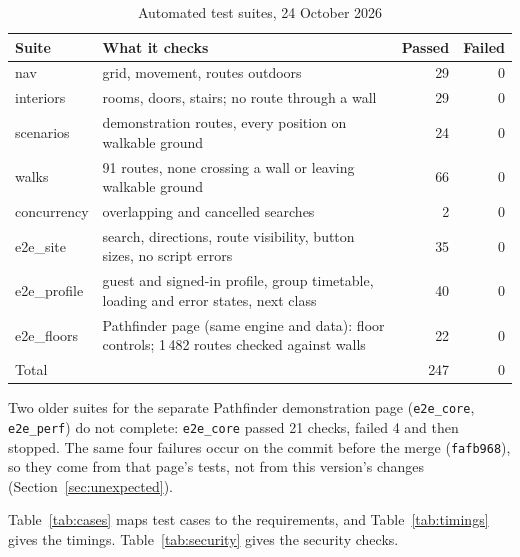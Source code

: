 \documentclass[12pt,a4paper]{report}
\newcommand{\tablespacing}{\singlespacing\small}
\begin{document}
\begin{table}[htbp]
\centering\tablespacing
\caption{Automated test suites, 24 October 2026}\label{tab:suites}
\begin{tabular}{p{3.2cm}p{7.3cm}r r}
\toprule
Suite & What it checks & Passed & Failed \\
\midrule
nav & grid, movement, routes outdoors & 29 & 0 \\
interiors & rooms, doors, stairs; no route through a wall & 29 & 0 \\
scenarios & demonstration routes, every position on walkable ground & 24 & 0 \\
walks & 91 routes, none crossing a wall or leaving walkable ground & 66 & 0 \\
concurrency & overlapping and cancelled searches & 2 & 0 \\
e2e\_site & search, directions, route visibility, button sizes, no script errors & 35 & 0 \\
e2e\_profile & guest and signed-in profile, group timetable, loading and error states, next class & 40 & 0 \\
e2e\_floors & Pathfinder page (same engine and data): floor controls; 1\,482 routes checked against walls & 22 & 0 \\
\midrule
Total & & 247 & 0 \\
\bottomrule
\end{tabular}
\end{table}

Two older suites for the separate Pathfinder demonstration page (\texttt{e2e\_core}, \texttt{e2e\_perf}) do not complete: \texttt{e2e\_core} passed 21 checks, failed 4 and then stopped. The same four failures occur on the commit before the merge (\texttt{fafb968}), so they come from that page's tests, not from this version's changes (Section~\ref{sec:unexpected}).

Table~\ref{tab:cases} maps test cases to the requirements, and Table~\ref{tab:timings} gives the timings. Table~\ref{tab:security} gives the security checks.
\end{document}
